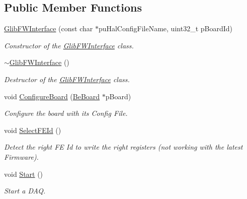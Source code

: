 \subsection*{Public Member Functions}
\begin{CompactItemize}
\item 
\hyperlink{class_ph2___hw_interface_1_1_glib_f_w_interface_ef1044c390e934afa17cdf9566ac71c3}{Glib\-FWInterface} (const char $\ast$pu\-Hal\-Config\-File\-Name, uint32\_\-t p\-Board\-Id)
\begin{CompactList}\small\item\em Constructor of the \hyperlink{class_ph2___hw_interface_1_1_glib_f_w_interface}{Glib\-FWInterface} class. \item\end{CompactList}\item 
\hyperlink{class_ph2___hw_interface_1_1_glib_f_w_interface_8cd8fec61b8e8327b142beddcd512b34}{$\sim$Glib\-FWInterface} ()
\begin{CompactList}\small\item\em Destructor of the \hyperlink{class_ph2___hw_interface_1_1_glib_f_w_interface}{Glib\-FWInterface} class. \item\end{CompactList}\item 
void \hyperlink{class_ph2___hw_interface_1_1_glib_f_w_interface_52658cd813658d4fae48a79bdabaa5cc}{Configure\-Board} (\hyperlink{class_ph2___hw_description_1_1_be_board}{Be\-Board} $\ast$p\-Board)
\begin{CompactList}\small\item\em Configure the board with its Config File. \item\end{CompactList}\item 
void \hyperlink{class_ph2___hw_interface_1_1_glib_f_w_interface_2ce120711b8a58610f779813064d2c8f}{Select\-FEId} ()
\begin{CompactList}\small\item\em Detect the right FE Id to write the right registers (not working with the latest Firmware). \item\end{CompactList}\item 
void \hyperlink{class_ph2___hw_interface_1_1_glib_f_w_interface_debd47ee3a84dbb8b60f6dd521921aac}{Start} ()
\begin{CompactList}\small\item\em Start a DAQ. \item\end{CompactList}\item 

\end{CompactItemize}
